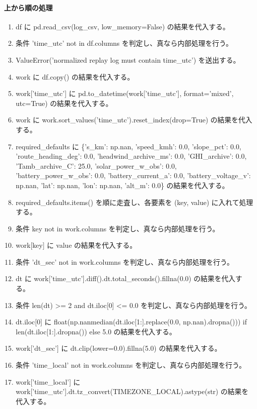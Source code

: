 \documentclass[a4paper,11pt]{article}
\begin{document}
            \paragraph{上から順の処理}
            \begin{enumerate}[leftmargin=1.8em]
            \item df に pd.read\_csv(log\_csv, low\_memory=False) の結果を代入する。
\item 条件 'time\_utc' not in df.columns を判定し、真なら内部処理を行う。
\item   ValueError('normalized replay log must contain time\_utc') を送出する。
\item work に df.copy() の結果を代入する。
\item work['time\_utc'] に pd.to\_datetime(work['time\_utc'], format='mixed', utc=True) の結果を代入する。
\item work に work.sort\_values('time\_utc').reset\_index(drop=True) の結果を代入する。
\item required\_defaults に \{'s\_km': np.nan, 'speed\_kmh': 0.0, 'slope\_pct': 0.0, 'route\_heading\_deg': 0.0, 'headwind\_archive\_ms': 0.0, 'GHI\_archive': 0.0, 'Tamb\_archive\_C': 25.0, 'solar\_power\_w\_obs': 0.0, 'battery\_power\_w\_obs': 0.0, 'battery\_current\_a': 0.0, 'battery\_voltage\_v': np.nan, 'lat': np.nan, 'lon': np.nan, 'alt\_m': 0.0\} の結果を代入する。
\item required\_defaults.items() を順に走査し、各要素を (key, value) に入れて処理する。
\item   条件 key not in work.columns を判定し、真なら内部処理を行う。
\item     work[key] に value の結果を代入する。
\item 条件 'dt\_sec' not in work.columns を判定し、真なら内部処理を行う。
\item   dt に work['time\_utc'].diff().dt.total\_seconds().fillna(0.0) の結果を代入する。
\item   条件 len(dt) >= 2 and dt.iloc[0] <= 0.0 を判定し、真なら内部処理を行う。
\item     dt.iloc[0] に float(np.nanmedian(dt.iloc[1:].replace(0.0, np.nan).dropna())) if len(dt.iloc[1:].dropna()) else 5.0 の結果を代入する。
\item   work['dt\_sec'] に dt.clip(lower=0.0).fillna(5.0) の結果を代入する。
\item 条件 'time\_local' not in work.columns を判定し、真なら内部処理を行う。
\item   work['time\_local'] に work['time\_utc'].dt.tz\_convert(TIMEZONE\_LOCAL).astype(str) の結果を代入する。

\end{enumerate}
\end{document}
